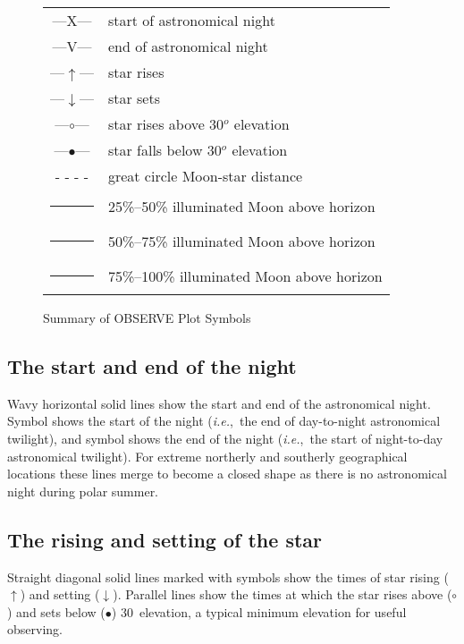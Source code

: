 \begin{figure}[h]\caption{Summary of OBSERVE Plot Symbols}
\label{fig:sum}
\begin{center}
\begin{tabular}{|c|l|}
\hline
\large
---{\sf X}--- & start of astronomical night \\
---{\sf V}--- & end of astronomical night \\
---$\uparrow$--- & star rises \\
---$\downarrow$--- & star sets \\
---$\circ$--- & star rises above 30$^o$ elevation\\
---$\bullet$--- & star falls below 30$^o$ elevation\\
- - - - & great circle Moon-star distance \\
\rule{0.1mm}{4mm} & 25\%--50\% illuminated Moon above horizon\\
\rule{0.3mm}{4mm} & 50\%--75\% illuminated Moon above horizon\\
\rule{0.5mm}{4mm} & 75\%--100\% illuminated Moon above horizon\\
\hline
\end{tabular}
\end{center}
\end{figure}

\subsection{The start and end of the night}

Wavy horizontal solid lines show the start and end of the  astronomical
night.  Symbol {}  shows the start of the night ({\em{i.e.}},~the
end of day-to-night astronomical  twilight), and  symbol {} shows
the end of the night ({\em{i.e.}},~the start of night-to-day
astronomical twilight). For extreme  northerly and southerly
geographical locations these lines merge to become a closed shape as
there is no astronomical night during polar summer.

\subsection{The rising and setting of the star}

Straight diagonal solid lines marked with symbols  show the times of
star rising ($\uparrow$) and setting ($\downarrow$). Parallel lines
show the times at  which the star rises above ($\circ$) and sets below
($\bullet$) 30\degrees\ elevation, a typical minimum elevation for
useful observing.

